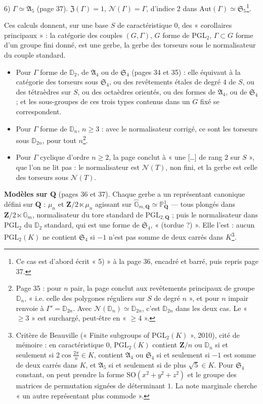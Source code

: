 \documentclass[11pt,a4paper]{article}
\begin{document}
6) $\Gamma \simeq \mathfrak{A}_5$ (page 37). $\mathfrak{Z}(\Gamma) = 1$,
$\mathcal{N}(\Gamma) = \Gamma$, d'indice $2$ dans $\mathrm{Aut}(\Gamma) \simeq
\mathfrak{S}_5$\footnote{Ce cas est d'abord écrit « 5) » à la page 36, encadré
et barré, puis repris page 37.}.

Ces calculs donnent, sur une base $S$ de caractéristique $0$, des
« corollaires principaux » : la catégorie des couples $(G, \Gamma)$, $G$ forme
de $\mathrm{PGL}_2$, $\Gamma \subset G$ forme d'un groupe fini donné, est une
gerbe, la gerbe des torseurs sous le normalisateur du couple standard.
\begin{itemize}
  \item Pour $\Gamma$ forme de $\mathbb{D}_2$, de $\mathfrak{A}_4$ ou de
    $\mathfrak{S}_4$ (pages 34 et 35) : elle équivaut à la catégorie des
    torseurs sous $\mathfrak{S}_4$, ou des revêtements étales de degré $4$ de
    $S$, ou des tétraèdres sur $S$, ou des octaèdres orientés, ou des formes
    de $\mathfrak{A}_4$, ou de $\mathfrak{S}_4$ ; et les sous-groupes de ces
    trois types contenus dans un $G$ fixé se correspondent.
  \item Pour $\Gamma$ forme de $\mathbb{D}_n$, $n \geq 3$ : avec le
    normalisateur corrigé, ce sont les torseurs sous $\mathbb{D}_{2n}$, pour
    tout $n$\footnote{Page 35 : pour $n$ pair, la page conclut aux
    revêtements principaux de groupe $\mathbb{D}_n$, « i.e. celle des
    polygones réguliers sur $S$ de degré $n$ », et pour $n$ impair renvoie à
    $\Gamma' = \mathbb{D}_{2n}$. Avec $\mathcal{N}(\mathbb{D}_n) \simeq
    \mathbb{D}_{2n}$, c'est $\mathbb{D}_{2n}$ dans les deux cas. Le « $\geq 3$ »
    est surchargé, peut-être en « $\geq 4$ ».}.
  \item Pour $\Gamma$ cyclique d'ordre $n \geq 2$, la page conclut à « une
    [\ldots] de rang $2$ sur $S$ », que l'on ne lit pas : le normalisateur est
    $\mathcal{N}(T)$, non fini, et la gerbe est celle des torseurs sous
    $\mathcal{N}(T)$.
\end{itemize}

\textbf{Modèles sur $\mathbf{Q}$} (pages 36 et 37). Chaque gerbe a un
représentant canonique défini sur $\mathbf{Q}$ : $\mu_n$ et $\mathbf{Z}/2
\ltimes \mu_n$ agissant sur $\widehat{\mathbb{G}}_{m,\mathbf{Q}} \simeq
\mathbb{P}^1_{\mathbf{Q}}$ --- tous plongés dans $\mathbf{Z}/2 \ltimes
\mathbb{G}_m$, normalisateur du tore standard de $\mathrm{PGL}_{2,\mathbf{Q}}$ ;
puis le normalisateur dans $\mathrm{PGL}_2$ du $\mathbb{D}_2$ standard, qui
est une forme de $\mathfrak{S}_4$, « (tordue ?) ». Elle l'est : aucun
$\mathrm{PGL}_2(K)$ ne contient $\mathfrak{S}_4$ si $-1$ n'est pas somme de deux
carrés dans $K$\footnote{Critère de Beauville (« Finite subgroups of
$\mathrm{PGL}_2(K)$ », 2010), cité de mémoire : en caractéristique $0$,
$\mathrm{PGL}_2(K)$ contient $\mathbf{Z}/n$ ou $\mathbb{D}_n$ si et seulement si
$2\cos\frac{2\pi}{n} \in K$, contient $\mathfrak{A}_4$ ou $\mathfrak{S}_4$ si et
seulement si $-1$ est somme de deux carrés dans $K$, et $\mathfrak{A}_5$ si et
seulement si de plus $\sqrt5 \in K$. Pour $\mathfrak{S}_4$ constant, on peut
prendre la forme $\mathrm{SO}(x^2 + y^2 + z^2)$ et le groupe des matrices de
permutation signées de déterminant $1$. La note marginale cherche « un autre
représentant plus commode ».}.
\end{document}
